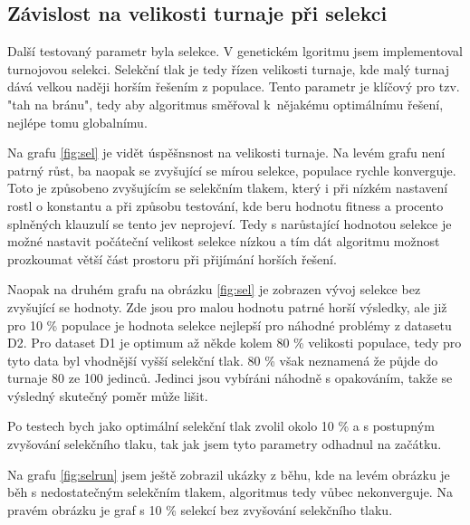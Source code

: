 \documentclass[11pt]{article}
\begin{document}
\subsection{Závislost na velikosti turnaje při selekci}
Další testovaný parametr byla selekce. V genetickém lgoritmu jsem implementoval turnojovou selekci. Selekční tlak je tedy řízen velikosti turnaje, kde malý turnaj dává velkou naději horším řešením z populace. Tento parametr je klíčový pro tzv. "tah na bránu", tedy aby algoritmus směřoval k~nějakému optimálnímu řešení, nejlépe tomu globalnímu. 

Na grafu \ref{fig:sel} je vidět úspěšnsnost na velikosti turnaje. Na levém grafu není patrný růst, ba naopak se zvyšující se mírou selekce, populace rychle konverguje. Toto je způsobeno zvyšujícím se selekčním tlakem, který i při nízkém nastavení rostl o konstantu a při způsobu testování, kde beru hodnotu fitness a procento splněných klauzulí se tento jev neprojeví. Tedy s narůstající hodnotou selekce je možné nastavit počáteční velikost selekce nízkou a tím dát algoritmu možnost prozkoumat větší část prostoru při přijímání horších řešení. 

Naopak na druhém grafu na obrázku \ref{fig:sel} je zobrazen vývoj selekce bez zvyšující se hodnoty. Zde jsou pro malou hodnotu patrné  horší výsledky, ale již pro 10 \% populace je hodnota selekce nejlepší pro náhodné problémy z datasetu D2. Pro dataset D1 je optimum až někde kolem 80 \% velikosti populace, tedy pro tyto data byl vhodnější vyšší selekční tlak. 80 \% však neznamená že půjde do turnaje 80 ze 100 jedinců. Jedinci jsou vybíráni náhodně s opakováním, takže se výsledný skutečný poměr může lišit.

Po testech bych jako optimální selekční tlak zvolil okolo 10 \% a s postupným zvyšování selekčního tlaku, tak jak jsem tyto parametry odhadnul na začátku. 

Na grafu \ref{fig:selrun} jsem ještě zobrazil ukázky z běhu, kde na levém obrázku je běh s nedostatečným selekčním tlakem, algoritmus tedy vůbec nekonverguje. Na pravém obrázku je graf s 10 \% selekcí bez zvyšování selekčního tlaku. 
\end{document}
